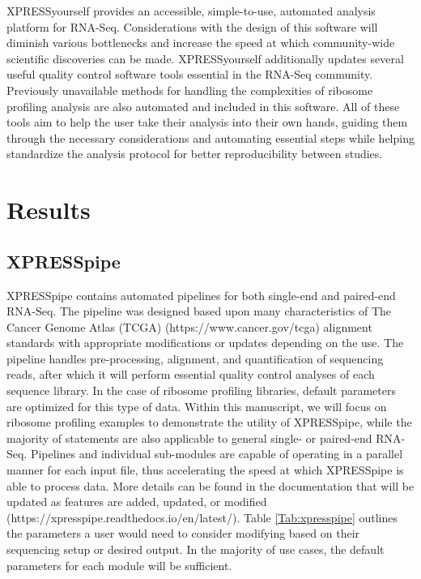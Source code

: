 \documentclass[10pt, oneside]{article}
\begin{document}
XPRESSyourself provides an accessible, simple-to-use, automated analysis platform for RNA-Seq. Considerations with the design of this software will diminish various bottlenecks and increase the speed at which community-wide scientific discoveries can be made. XPRESSyourself additionally updates several useful quality control software tools essential in the RNA-Seq community. Previously unavailable methods for handling the complexities of ribosome profiling analysis are also automated and included in this software. All of these tools aim to help the user take their analysis into their own hands, guiding them through the necessary considerations and automating essential steps while helping standardize the analysis protocol for better reproducibility between studies.


\section{Results}

\subsection{XPRESSpipe}
XPRESSpipe contains automated pipelines for both single-end and paired-end RNA-Seq. The pipeline was designed based upon many characteristics of The Cancer Genome Atlas (TCGA) (https://www.cancer.gov/tcga) alignment standards with appropriate modifications or updates depending on the use. The pipeline handles pre-processing, alignment, and quantification of sequencing reads, after which it will perform essential quality control analyses of each sequence library. In the case of ribosome profiling libraries, default parameters are optimized for this type of data. Within this manuscript, we will focus on ribosome profiling examples to demonstrate the utility of XPRESSpipe, while the majority of statements are also applicable to general single- or paired-end RNA-Seq. Pipelines and individual sub-modules are capable of operating in a parallel manner for each input file, thus accelerating the speed at which XPRESSpipe is able to process data. More details can be found in the documentation that will be updated as features are added, updated, or modified (https://xpresspipe.readthedocs.io/en/latest/). Table \ref{Tab:xpresspipe} outlines the parameters a user would need to consider modifying based on their sequencing setup or desired output. In the majority of use cases, the default parameters for each module will be sufficient. \par
\end{document}

